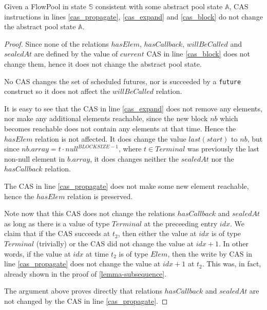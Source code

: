 \documentclass[runningheads,a4paper]{llncs}
\begin{document}
\begin{lemma}[Housekeeping]\label{lemma-housekeeping}
Given a FlowPool in state $\mathbb{S}$ consistent with some abstract
pool state $\mathbb{A}$, CAS instructions in lines \ref{cas_propagate}, \ref{cas_expand} and
\ref{cas_block} do not change the abstract pool state $\mathbb{A}$.
\end{lemma}

\begin{proof}
Since none of the relations $hasElem$, $hasCallback$, $willBeCalled$ and $sealedAt$
are defined by the value of $current$ CAS in line \ref{cas_block}
does not change them, hence it does not change the abstract pool
state.

No CAS changes the set of scheduled futures, nor is
succeeded by a \verb=future= construct so it does not affect
the $willBeCalled$ relation.

It is easy to see that the CAS in line \ref{cas_expand} does not remove any elements, nor make
any additional elements reachable, since the new block $nb$ which
becomes reachable does not contain any elements at that time.
Hence the $hasElem$ relation is not affected.
It does change the value $last(start)$ to $nb$, but since $nb.array =
t \cdot null^{BLOCKSIZE - 1}$, where $t \in Terminal$ was previously
the last non-null element in $b.array$, it does changes neither the
$sealedAt$ nor the $hasCallback$ relation.

The CAS in line \ref{cas_propagate} does not make some new element reachable,
hence the $hasElem$ relation is preserved.

Note now that this CAS does not change the relations $hasCallback$
and $sealedAt$ as long as there is a value of type $Terminal$ at the
preceeding entry $idx$.
We claim that if the CAS succeeds at $t_2$, then 
either the value at $idx$ is of type $Terminal$ (trivially) or the CAS
did not change the value at $idx + 1$.
In other words, if the value at $idx$ at time $t_2$ is of type $Elem$,
then the write by CAS in line \ref{cas_propagate} does not change
the value at $idx + 1$ at $t_2$.
This was, in fact, already shown in the proof of \ref{lemma-subsequence}.

The argument above proves directly that relations $hasCallback$
and $sealedAt$ are not changed by the CAS in line \ref{cas_propagate}.
\end{proof}
\end{document}
